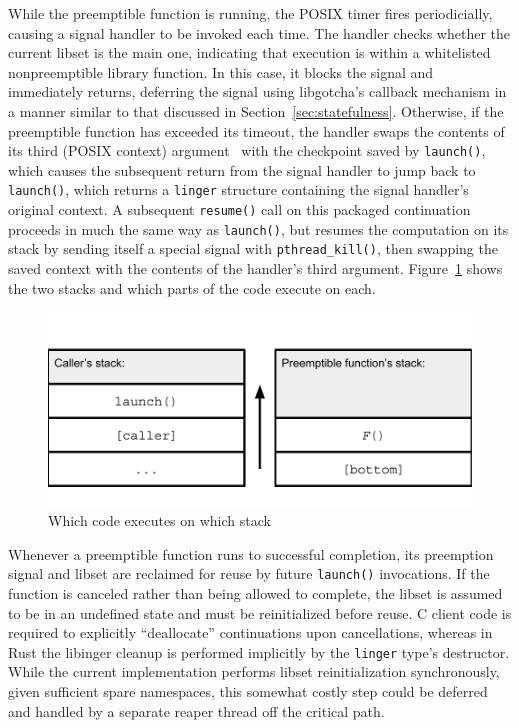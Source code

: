 While the preemptible function is running, the POSIX timer fires periodicially,
causing a signal handler to be invoked each time.  The handler checks whether the
current libset is the main one, indicating that execution is within a whitelisted
nonpreemptible library function.  In this case, it blocks the signal and immediately
returns, deferring the signal using libgotcha's callback mechanism in a manner
similar to that discussed in Section~\ref{sec:statefulness}.  Otherwise, if the
preemptible function has exceeded its timeout, the handler swaps the contents of its
third (POSIX context) argument~\cite{sigaction-manpage} with the checkpoint saved by
\texttt{launch()}, which causes the subsequent return from the signal handler to jump
back to \texttt{launch()}, which returns a \texttt{linger} structure containing the
signal handler's original context.  A subsequent \texttt{resume()} call on this
packaged continuation proceeds in much the same way as \texttt{launch()}, but
resumes the computation on its stack by sending itself a special signal with
\texttt{pthread\_kill()}, then swapping the saved context with the contents of the
handler's third argument.  Figure~\ref{fig:twostacks} shows the two stacks and which
parts of the code execute on each.

\begin{figure}
\includegraphics[width=\columnwidth]{figs/twostacks}
\caption{Which code executes on which stack}
\label{fig:twostacks}
\end{figure}

Whenever a preemptible function runs to successful completion, its preemption signal
and libset are reclaimed for reuse by future \texttt{launch()} invocations.  If the
function is canceled rather than being allowed to complete, the libset is assumed to
be in an undefined state and must be reinitialized before reuse.  C client code is
required to explicitly ``deallocate'' continuations upon cancellations, whereas in
Rust the libinger cleanup is performed implicitly by the \texttt{linger} type's
destructor.  While the current implementation performs libset reinitialization
synchronously, given sufficient spare namespaces, this somewhat costly step could be
deferred and handled by a separate reaper thread off the critical path.

